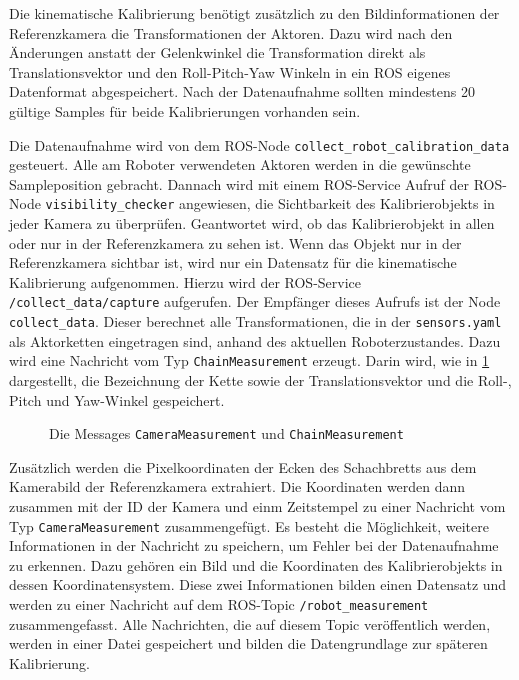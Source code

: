 Die kinematische Kalibrierung benötigt zusätzlich zu den Bildinformationen der 
Referenzkamera die Transformationen der Aktoren. Dazu wird nach den Änderungen
anstatt der Gelenkwinkel die Transformation direkt als Translationsvektor und 
den Roll-Pitch-Yaw Winkeln in ein \ac{ROS} eigenes Datenformat abgespeichert.
Nach der Datenaufnahme sollten mindestens 20 gültige Samples für beide 
Kalibrierungen vorhanden sein. 

Die Datenaufnahme wird von dem \ac{ROS}-Node \texttt{collect\_robot\_\allowbreak calibration\_\allowbreak data}
gesteuert. Alle am Roboter verwendeten Aktoren werden  in
die gewünschte Sampleposition gebracht. Dannach wird mit einem \ac{ROS}-Service
Aufruf der \ac{ROS}-Node \texttt{visibility\_checker} angewiesen, die Sichtbarkeit
des Kalibrierobjekts in jeder Kamera zu überprüfen. Geantwortet wird, ob das 
Kalibrierobjekt in allen oder nur in der Referenzkamera zu sehen ist. 
Wenn das Objekt nur in der Referenzkamera sichtbar ist, wird nur ein Datensatz
für die kinematische Kalibrierung aufgenommen. Hierzu wird der \ac{ROS}-Service
\texttt{/collect\_data/capture} aufgerufen. Der Empfänger dieses Aufrufs ist 
der Node \texttt{collect\_data}. Dieser berechnet alle Transformationen, die in 
der \texttt{sensors.yaml} als Aktorketten eingetragen sind, anhand des aktuellen
Roboterzustandes. Dazu wird eine Nachricht vom Typ \texttt{ChainMeasurement}
erzeugt. Darin wird, wie in \ref{fig:messages} dargestellt, die Bezeichnung der 
Kette sowie der Translationsvektor und die Roll-, Pitch und Yaw-Winkel 
gespeichert.
\begin{figure}[htpb]
  \centering
  
  \caption{Die Messages \texttt{CameraMeasurement} und \texttt{ChainMeasurement}}
  \label{fig:messages}
\end{figure}
Zusätzlich werden die Pixelkoordinaten der Ecken des Schachbretts
aus dem Kamerabild der Referenzkamera extrahiert. Die Koordinaten werden dann 
zusammen mit der ID der Kamera und einm Zeitstempel zu einer Nachricht vom Typ 
\texttt{CameraMeasurement} zusammengefügt. Es besteht die Möglichkeit, weitere Informationen
in der Nachricht zu speichern, um Fehler bei der Datenaufnahme zu erkennen.
Dazu gehören ein Bild und die Koordinaten des 
Kalibrierobjekts in dessen Koordinatensystem. Diese zwei Informationen 
bilden einen Datensatz und werden zu einer Nachricht auf dem \ac{ROS}-Topic
\texttt{/robot\_measurement} zusammengefasst. Alle Nachrichten, die auf diesem 
Topic veröffentlich werden, werden in einer Datei gespeichert und bilden die
Datengrundlage zur späteren Kalibrierung.

